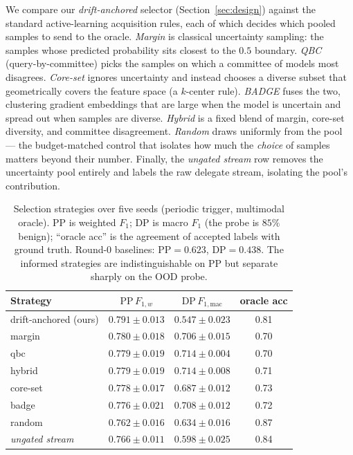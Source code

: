 We compare our \emph{drift-anchored} selector (Section~\ref{sec:design}) against
the standard active-learning acquisition rules, each of which decides which pooled
samples to send to the oracle. \emph{Margin} is classical uncertainty sampling:
the samples whose predicted probability sits closest to the $0.5$ boundary.
\emph{QBC} (query-by-committee) picks the samples on which a committee of models
most disagrees. \emph{Core-set} ignores uncertainty and instead chooses a diverse
subset that geometrically covers the feature space (a $k$-center rule).
\emph{BADGE} fuses the two, clustering gradient embeddings that are large when the
model is uncertain and spread out when samples are diverse. \emph{Hybrid} is a
fixed blend of margin, core-set diversity, and committee disagreement.
\emph{Random} draws uniformly from the pool --- the budget-matched control that
isolates how much the \emph{choice} of samples matters beyond their number.
Finally, the \emph{ungated stream} row removes the uncertainty pool entirely and
labels the raw delegate stream, isolating the pool's contribution.

\begin{table}[H]
\centering
\caption{Selection strategies over five seeds (periodic trigger, multimodal
oracle). PP is weighted $F_1$; DP is macro $F_1$ (the probe is $85\%$ benign);
``oracle acc'' is the agreement of accepted labels with ground truth. Round-0
baselines: $\mathrm{PP}=0.623$, $\mathrm{DP}=0.438$. The informed strategies are
indistinguishable on PP but separate sharply on the OOD probe.}
\label{tab:al-strategy}
\small
\begin{tabular}{@{}lccc@{}}
\toprule
Strategy & $\mathrm{PP}\,F_{1,w}$ & $\mathrm{DP}\,F_{1,\mathrm{mac}}$ & oracle acc \\
\midrule
drift-anchored (ours) & $\mathbf{0.791 \pm 0.013}$ & $0.547 \pm 0.023$ & 0.81 \\
margin     & $0.780 \pm 0.018$ & $0.706 \pm 0.015$ & 0.70 \\
qbc        & $0.779 \pm 0.019$ & $0.714 \pm 0.004$ & 0.70 \\
hybrid     & $0.779 \pm 0.019$ & $0.714 \pm 0.008$ & 0.71 \\
core-set   & $0.778 \pm 0.017$ & $0.687 \pm 0.012$ & 0.73 \\
badge      & $0.776 \pm 0.021$ & $0.708 \pm 0.012$ & 0.72 \\
random     & $0.762 \pm 0.016$ & $0.634 \pm 0.016$ & 0.87 \\
\midrule
\emph{ungated stream} & $0.766 \pm 0.011$ & $0.598 \pm 0.025$ & 0.84 \\
\bottomrule
\end{tabular}
\end{table}

